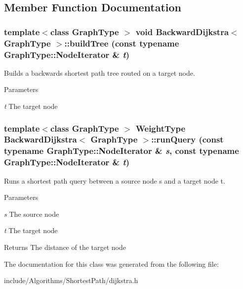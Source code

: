 \subsection{Member Function Documentation}
\hypertarget{class_backward_dijkstra_a5f505399fd812f67b311e63f9f80654f}{
\subsubsection[{buildTree}]{\setlength{\rightskip}{0pt plus 5cm}template$<$class GraphType $>$ void {\bf BackwardDijkstra}$<$ GraphType $>$::buildTree (const typename GraphType::NodeIterator \& {\em t})}}
\label{class_backward_dijkstra_a5f505399fd812f67b311e63f9f80654f}


Builds a backwards shortest path tree routed on a target node. 


\begin{DoxyParams}{Parameters}
\item[{\em t}]The target node \end{DoxyParams}
\hypertarget{class_backward_dijkstra_a00388196b398e4d2180675bc758d6a58}{
\subsubsection[{runQuery}]{\setlength{\rightskip}{0pt plus 5cm}template$<$class GraphType $>$ WeightType {\bf BackwardDijkstra}$<$ GraphType $>$::runQuery (const typename GraphType::NodeIterator \& {\em s}, \/  const typename GraphType::NodeIterator \& {\em t})}}
\label{class_backward_dijkstra_a00388196b398e4d2180675bc758d6a58}


Runs a shortest path query between a source node s and a target node t. 


\begin{DoxyParams}{Parameters}
\item[{\em s}]The source node \item[{\em t}]The target node \end{DoxyParams}
\begin{DoxyReturn}{Returns}
The distance of the target node 
\end{DoxyReturn}


The documentation for this class was generated from the following file:\begin{DoxyCompactItemize}
\item 
include/Algorithms/ShortestPath/dijkstra.h\end{DoxyCompactItemize}
